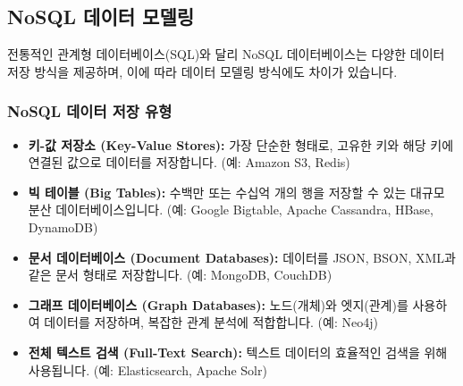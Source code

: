 \documentclass[11pt,a4paper]{article}
\theoremstyle{definition}
\begin{document}
\subsection{NoSQL 데이터 모델링}
전통적인 관계형 데이터베이스(SQL)와 달리 NoSQL 데이터베이스는 다양한 데이터 저장 방식을 제공하며, 이에 따라 데이터 모델링 방식에도 차이가 있습니다.

\subsubsection{NoSQL 데이터 저장 유형}
\begin{itemize}
    \item \textbf{키-값 저장소 (Key-Value Stores):} 가장 단순한 형태로, 고유한 키와 해당 키에 연결된 값으로 데이터를 저장합니다. (예: Amazon S3, Redis)
    \item \textbf{빅 테이블 (Big Tables):} 수백만 또는 수십억 개의 행을 저장할 수 있는 대규모 분산 데이터베이스입니다. (예: Google Bigtable, Apache Cassandra, HBase, DynamoDB)
    \item \textbf{문서 데이터베이스 (Document Databases):} 데이터를 JSON, BSON, XML과 같은 문서 형태로 저장합니다. (예: MongoDB, CouchDB)
    \item \textbf{그래프 데이터베이스 (Graph Databases):} 노드(개체)와 엣지(관계)를 사용하여 데이터를 저장하며, 복잡한 관계 분석에 적합합니다. (예: Neo4j)
    \item \textbf{전체 텍스트 검색 (Full-Text Search):} 텍스트 데이터의 효율적인 검색을 위해 사용됩니다. (예: Elasticsearch, Apache Solr)
\end{itemize}
\end{document}
